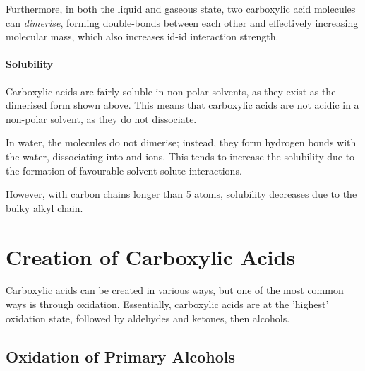 		\pagebreak
		Furthermore, in both the liquid and gaseous state, two carboxylic acid molecules can \textit{dimerise}, forming double-bonds between
		each other and effectively increasing molecular mass, which also increases id-id interaction strength.




		\paragraph{Solubility}

		Carboxylic acids are fairly soluble in non-polar solvents, as they exist as the dimerised form shown above. This means that carboxylic acids
		are not acidic in a non-polar solvent, as they do not dissociate.

		In water, the molecules do not dimerise; instead, they form hydrogen bonds with the water, dissociating into  and  ions.
		This tends to increase the solubility due to the formation of favourable solvent-solute interactions.

		However, with carbon chains longer than 5 atoms, solubility decreases due to the bulky alkyl chain.



	\pagebreak
	\section{Creation of Carboxylic Acids}

		Carboxylic acids can be created in various ways, but one of the most common ways is through oxidation. Essentially, carboxylic acids
		are at the 'highest' oxidation state, followed by aldehydes and ketones, then alcohols.

		\subsection{Oxidation of Primary Alcohols}

